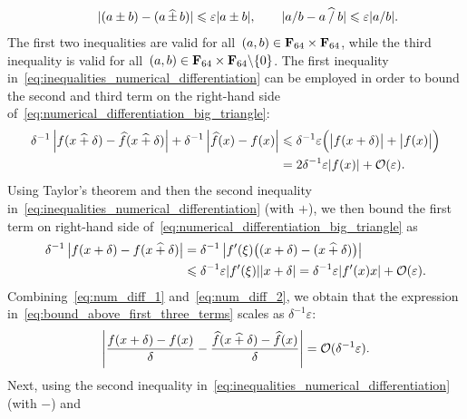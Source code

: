 \begin{solution}
\begin{align}
        \qquad \lvert (a\pm b) - (a \, \widehat \pm\, b) \rvert \leqslant \varepsilon \lvert a\pm b\rvert,
        \qquad \lvert a/b - a \mathbin{\widehat /} b\rvert \leqslant \varepsilon \lvert a/b \rvert.
    \end{align}
    The first two inequalities are valid for all~$(a, b) \in \mathbf F_{64} \times \mathbf F_{64}$,
    while the third inequality is valid for all~$(a, b) \in \mathbf F_{64} \times \mathbf F_{64} \backslash \{0\}$.
    The first inequality in~\eqref{eq:inequalities_numerical_differentiation}
    can be employed in order to bound the second and third term on the right-hand side of~\eqref{eq:numerical_differentiation_big_triangle}:
    \begin{align}
        \nonumber
        \delta^{-1}\left\lvert f(x \mathbin{\widehat +} \delta) - \widehat f(x \mathbin{\widehat +} \delta) \right\rvert
        + \delta^{-1} \left\lvert \widehat f(x) - f(x) \right\rvert
        \nonumber
        &\leqslant \delta^{-1} \varepsilon \Bigl( \bigl\lvert f(x + \delta) \bigr\rvert + \bigl\lvert f(x) \bigr\rvert  \Bigr) \\
        \label{eq:num_diff_1}
        &= 2 \delta^{-1} \varepsilon \lvert f(x)\rvert + \mathcal O(\varepsilon).
    \end{align}
    Using Taylor's theorem and then the second inequality in~\eqref{eq:inequalities_numerical_differentiation} (with $+$),
    we then bound the first term on right-hand side of~\eqref{eq:numerical_differentiation_big_triangle} as
    \begin{align}
        \nonumber
        \delta^{-1}\left\lvert f(x + \delta) - f(x \mathbin{\widehat +} \delta) \right\rvert
        &= \delta^{-1} \left\lvert f'(\xi) \bigl( (x + \delta) - (x \mathbin{\widehat +} \delta)  \bigr) \right\rvert \\
        \label{eq:num_diff_2}
        &\leqslant \delta^{-1} \varepsilon \lvert f'(\xi) \rvert \lvert x + \delta \rvert
        = \delta^{-1} \varepsilon \lvert f'(x) x \rvert  + \mathcal O(\varepsilon).
    \end{align}
    Combining~\eqref{eq:num_diff_1} and~\eqref{eq:num_diff_2},
    we obtain that the expression in~\eqref{eq:bound_above_first_three_terms} scales as $\delta^{-1} \varepsilon$:
    \begin{equation}
        \label{eq:numerical_differentiation_term1}
        \left\lvert \frac{f(x+\delta) - f(x) }{\delta} - \frac{ \widehat f(x\mathbin{\widehat +}\delta) - \widehat f(x) }{\delta} \right\rvert
         = \mathcal O(\delta^{-1} \varepsilon).
    \end{equation}
    Next, using the second inequality in~\eqref{eq:inequalities_numerical_differentiation} (with $-$) and

\end{solution}

